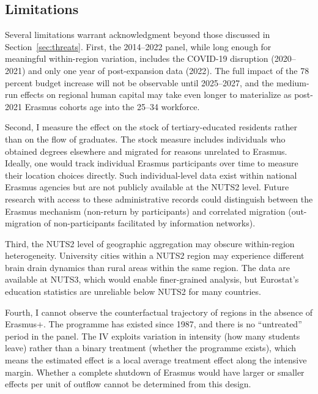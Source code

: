 \documentclass[12pt]{article}
\begin{document}
\subsection{Limitations}

Several limitations warrant acknowledgment beyond those discussed in Section~\ref{sec:threats}. First, the 2014--2022 panel, while long enough for meaningful within-region variation, includes the COVID-19 disruption (2020--2021) and only one year of post-expansion data (2022). The full impact of the 78 percent budget increase will not be observable until 2025--2027, and the medium-run effects on regional human capital may take even longer to materialize as post-2021 Erasmus cohorts age into the 25--34 workforce.

Second, I measure the effect on the stock of tertiary-educated residents rather than on the flow of graduates. The stock measure includes individuals who obtained degrees elsewhere and migrated for reasons unrelated to Erasmus. Ideally, one would track individual Erasmus participants over time to measure their location choices directly. Such individual-level data exist within national Erasmus agencies but are not publicly available at the NUTS2 level. Future research with access to these administrative records could distinguish between the Erasmus mechanism (non-return by participants) and correlated migration (out-migration of non-participants facilitated by information networks).

Third, the NUTS2 level of geographic aggregation may obscure within-region heterogeneity. University cities within a NUTS2 region may experience different brain drain dynamics than rural areas within the same region. The \citet{vaisanen_2025} data are available at NUTS3, which would enable finer-grained analysis, but Eurostat's education statistics are unreliable below NUTS2 for many countries.

Fourth, I cannot observe the counterfactual trajectory of regions in the absence of Erasmus+. The programme has existed since 1987, and there is no ``untreated'' period in the panel. The IV exploits variation in intensity (how many students leave) rather than a binary treatment (whether the programme exists), which means the estimated effect is a local average treatment effect along the intensive margin. Whether a complete shutdown of Erasmus would have larger or smaller effects per unit of outflow cannot be determined from this design.


\end{document}
